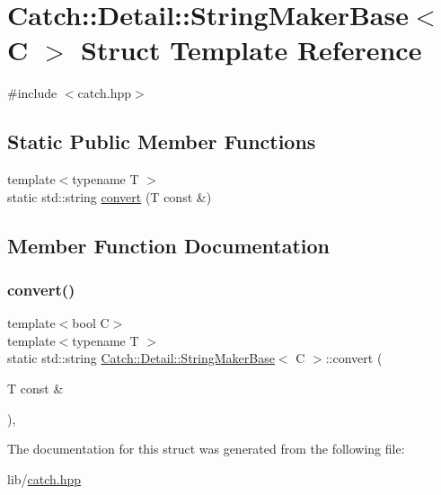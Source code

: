 \hypertarget{struct_catch_1_1_detail_1_1_string_maker_base}{}\section{Catch\+:\+:Detail\+:\+:String\+Maker\+Base$<$ C $>$ Struct Template Reference}
\label{struct_catch_1_1_detail_1_1_string_maker_base}


{\ttfamily \#include $<$catch.\+hpp$>$}

\subsection*{Static Public Member Functions}
\begin{DoxyCompactItemize}
\item 
{\footnotesize template$<$typename T $>$ }\\static std\+::string \hyperlink{struct_catch_1_1_detail_1_1_string_maker_base_a8eb9f635dc413a5758e22614bafaf1a3}{convert} (T const \&)
\end{DoxyCompactItemize}


\subsection{Member Function Documentation}
\hypertarget{struct_catch_1_1_detail_1_1_string_maker_base_a8eb9f635dc413a5758e22614bafaf1a3}{}\label{struct_catch_1_1_detail_1_1_string_maker_base_a8eb9f635dc413a5758e22614bafaf1a3} 
\subsubsection{\texorpdfstring{convert()}{convert()}}
{\footnotesize\ttfamily template$<$bool C$>$ \\
template$<$typename T $>$ \\
static std\+::string \hyperlink{struct_catch_1_1_detail_1_1_string_maker_base}{Catch\+::\+Detail\+::\+String\+Maker\+Base}$<$ C $>$\+::convert (\begin{DoxyParamCaption}\item[{T const \&}]{ }\end{DoxyParamCaption})\hspace{0.3cm}{\ttfamily [inline]}, {\ttfamily [static]}}



The documentation for this struct was generated from the following file\+:\begin{DoxyCompactItemize}
\item 
lib/\hyperlink{catch_8hpp}{catch.\+hpp}\end{DoxyCompactItemize}
